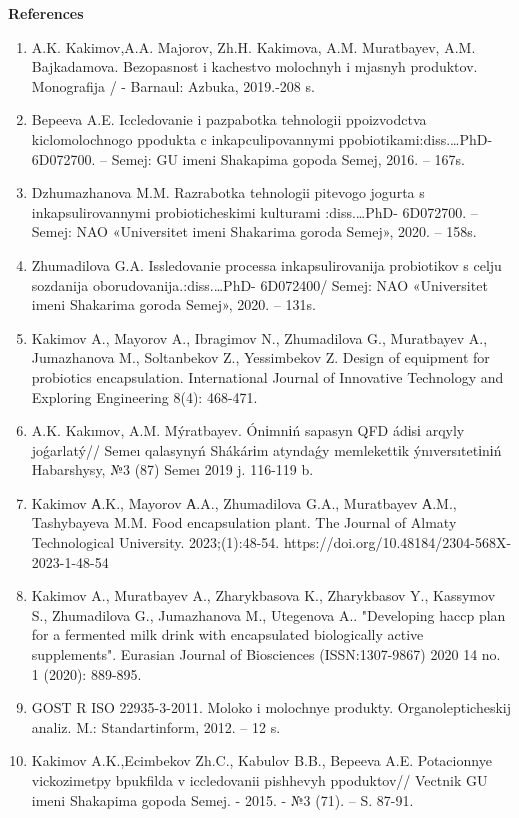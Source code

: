 {\bfseries References}

\begin{enumerate}
\item
A.K. Kakimov,A.A. Majorov, Zh.H. Kakimova, A.M. Muratbayev, A.M.
Bajkadamova. Bezopasnost\textquotesingle{} i kachestvo molochnyh i
mjasnyh produktov. Monografija / - Barnaul: Azbuka, 2019.-208 s.

\item
Bepeeva A.E. Iccledovanie i pazpabotka tehnologii ppoizvodctva
kiclomolochnogo ppodukta c inkapculipovannymi
ppobiotikami:diss.\ldots PhD- 6D072700. -- Semej: GU imeni Shakapima
gopoda Semej, 2016. -- 167s.

\item
Dzhumazhanova M.M. Razrabotka tehnologii pit\textquotesingle evogo
jogurta s inkapsulirovannymi probioticheskimi kul\textquotesingle turami
:diss.\ldots PhD- 6D072700. -- Semej: NAO «Universitet imeni Shakarima
goroda Semej», 2020. -- 158s.

\item
Zhumadilova G.A. Issledovanie processa inkapsulirovanija probiotikov
s cel\textquotesingle ju sozdanija oborudovanija.:diss.\ldots PhD-
6D072400/ Semej: NAO «Universitet imeni Shakarima goroda Semej», 2020.
-- 131s.

\item
Kakimov A., Mayorov A., Ibragimov N., Zhumadilova G., Muratbayev A.,
Jumazhanova M., Soltanbekov Z., Yessimbekov Z. Design of equipment for
probiotics encapsulation. International Journal of Innovative Technology
and Exploring Engineering 8(4): 468-471.

\item
A.K. Kakımov, A.M. Mýratbayev. Ónіmnіń sapasyn QFD ádіsі arqyly
joǵarlatý// Semeı qalasynyń Shákárіm atyndaǵy memlekettіk
ýnıversıtetіnіń Habarshysy, №3 (87) Semeı 2019 j. 116-119 b.

\item
Kakimov А.K., Mayorov А.A., Zhumadilova G.A., Muratbayev А.M.,
Tashybayeva M.M. Food encapsulation plant. The Journal of Almaty
Technological University. 2023;(1):48-54.
https://doi.org/10.48184/2304-568X-2023-1-48-54

\item
Kakimov A., Muratbayev A., Zharykbasova K., Zharykbasov Y., Kassymov
S., Zhumadilova G., Jumazhanova M., Utegenova A.. "Developing haccp plan
for a fermented milk drink with encapsulated biologically active
supplements". Eurasian Journal of Biosciences (ISSN:1307-9867) 2020 14
no. 1 (2020): 889-895.

\item
GOST R ISO 22935-3-2011. Moloko i molochnye produkty.
Organolepticheskij analiz. M.: Standartinform, 2012. -- 12 s.

\item
Kakimov A.K.,Ecimbekov Zh.C., Kabulov B.B., Bepeeva A.E. Potacionnye
vickozimetpy bpukfil\textquotesingle da v iccledovanii pishhevyh
ppoduktov// Vectnik GU imeni Shakapima gopoda Semej. - 2015. - №3 (71).
-- S. 87-91.
\end{enumerate}

